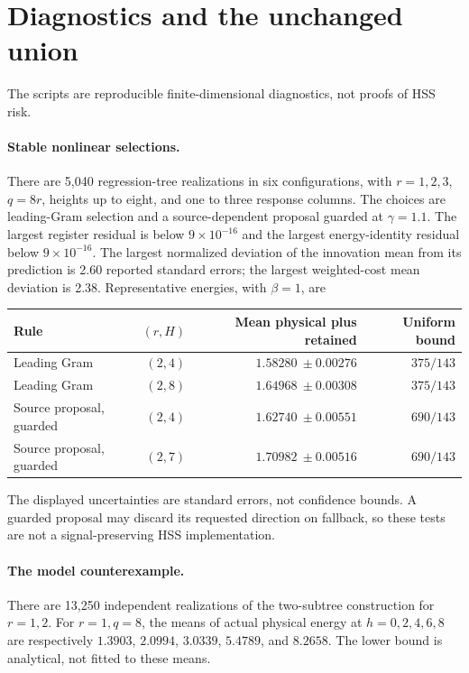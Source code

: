 \documentclass[11pt,oneside,openany,a4paper]{book}
\numberwithin{equation}{chapter}
\theoremstyle{definition}
\theoremstyle{remark}
\begin{document}
\section{Diagnostics and the unchanged union}\label{budget:sec:checks}
The scripts are reproducible finite-dimensional diagnostics, not proofs of HSS risk.

\paragraph{Stable nonlinear selections.}
There are 5,040 regression-tree realizations in six configurations, with $r=1,2,3$, $q=8r$, heights up to eight, and one to three response columns. The choices are leading-Gram selection and a source-dependent proposal guarded at $\gamma=1.1$. The largest register residual is below $9\times10^{-16}$ and the largest energy-identity residual below $9\times10^{-16}$. The largest normalized deviation of the innovation mean from its prediction is 2.60 reported standard errors; the largest weighted-cost mean deviation is 2.38. Representative energies, with $\beta=1$, are
\begin{center}
\begin{tabular}{lrrr}
\toprule Rule & $(r,H)$ & Mean physical plus retained & Uniform bound\\\midrule
Leading Gram & $(2,4)$ & $1.58280\ \pm0.00276$ & $375/143$\\
Leading Gram & $(2,8)$ & $1.64968\ \pm0.00308$ & $375/143$\\
Source proposal, guarded & $(2,4)$ & $1.62740\ \pm0.00551$ & $690/143$\\
Source proposal, guarded & $(2,7)$ & $1.70982\ \pm0.00516$ & $690/143$\\\bottomrule
\end{tabular}
\end{center}
The displayed uncertainties are standard errors, not confidence bounds. A guarded proposal may discard its requested direction on fallback, so these tests are not a signal-preserving HSS implementation.

\paragraph{The model counterexample.}
There are 13,250 independent realizations of the two-subtree construction for $r=1,2$. For $r=1,q=8$, the means of actual physical energy at $h=0,2,4,6,8$ are respectively $1.3903$, $2.0994$, $3.0339$, $5.4789$, and $8.2658$. The lower bound is analytical, not fitted to these means.
\end{document}
